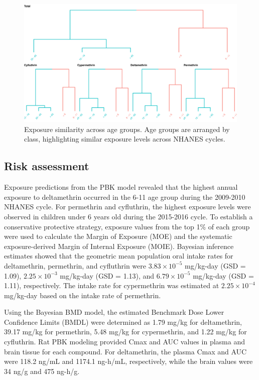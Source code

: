 \documentclass[toxics,article,submit,pdftex,moreauthors]{Definitions/mdpi}
\begin{document}
\begin{figure}[H]
\centering
\begin{adjustwidth}{-2cm}{}
\centering
\includegraphics[width=\linewidth]{figures/fig7}
\hfill
\end{adjustwidth}
\caption{Exposure similarity across age groups. Age groups are arranged by
class, highlighting similar exposure levels across NHANES cycles.\label{fig:fig7}}
\end{figure}

\subsection{Risk assessment}\label{risk-assessment}

Exposure predictions from the PBK model revealed that the highest annual
exposure to deltamethrin occurred in the 6-11 age group during the
2009-2010 NHANES cycle. For permethrin and cyfluthrin, the highest
exposure levels were observed in children under 6 years old during the
2015-2016 cycle. To establish a conservative protective strategy,
exposure values from the top 1\% of each group were used to calculate
the Margin of Exposure (MOE) and the systematic exposure-derived Margin
of Internal Exposure (MOIE). Bayesian inference estimates showed that
the geometric mean population oral intake rates for deltamethrin,
permethrin, and cyfluthrin were \(3.83 \times 10^{-5}\) mg/kg-day (GSD =
1.09), \(2.25 \times 10^{-3}\) mg/kg-day (GSD = 1.13), and \(6.79 \times
10^{-5}\) mg/kg-day (GSD = 1.11), respectively. The intake rate for
cypermethrin was estimated at \(2.25 \times 10^{-4}\) mg/kg-day based on
the intake rate of permethrin.

Using the Bayesian BMD model, the estimated Benchmark Dose Lower
Confidence Limits (BMDL) were determined as 1.79 mg/kg for deltamethrin,
39.17 mg/kg for permethrin, 5.48 mg/kg for cypermethrin, and 1.22 mg/kg
for cyfluthrin. Rat PBK modeling provided Cmax and AUC values in plasma
and brain tissue for each compound. For deltamethrin, the plasma Cmax
and AUC were 118.2 ng/mL and 1174.1 ng-h/mL, respectively, while the
brain values were 34 ng/g and 475 ng-h/g.
\end{document}

